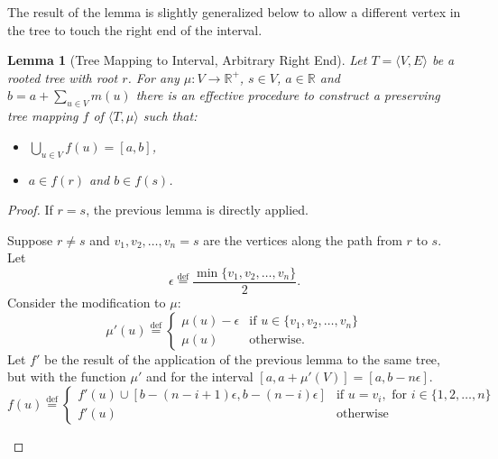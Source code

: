 \documentclass{article}
\newtheorem*{lemma}{Lemma}
\newcommand{\R}{\mathbb{R}}
\newcommand{\eqdef}{\stackrel{\text{def}}{=}}
\begin{document}
The result of the lemma is slightly generalized below to allow a different vertex in the tree to touch the right end of the interval.
\begin{lemma}[Tree Mapping to Interval, Arbitrary Right End]
    Let $T = \langle V, E \rangle$ be a rooted tree with root $r$. For any $\mu : V \rightarrow \R^+$, $s \in V$, $a \in \R$ and $b = a + \sum_{u \in V}m(u)$ there is an effective procedure to construct a preserving tree mapping $f$ of $\langle T, \mu \rangle$ such that:
  \begin{itemize}
  \item $\bigcup_{u \in V}f(u) = [a, b]$,
  \item $a \in f(r)$ and $b \in f(s)$.
  \end{itemize}
\end{lemma}
\begin{proof}
  If $r = s$, the previous lemma is directly applied.

  Suppose $r \neq s$ and $v_1, v_2, \dots, v_n = s$ are the vertices along the path from $r$ to $s$. Let
  \begin{equation*}
    \epsilon \eqdef \frac{\min\{v_1, v_2, \dots, v_n\}}{2}.
  \end{equation*}
  Consider the modification to $\mu$:
  \begin{equation*}
    \mu'(u) \eqdef
    \begin{cases}
      \mu(u) - \epsilon & \text{if } u \in \{v_1, v_2, \dots, v_n\} \\
      \mu(u) & \text{otherwise.}
    \end{cases}
  \end{equation*}
  Let $f'$ be the result of the application of the previous lemma to the same tree, but with the function $\mu'$ and for the interval $[a, a + \mu'(V)] = [a, b - n\epsilon]$.
  \begin{equation*}
    f(u) \eqdef
    \begin{cases}
      f'(u) \cup [b - (n - i + 1)\epsilon, b - (n - i)\epsilon] & \text{if } u = v_i, \text{ for } i \in \{1, 2, \dots, n\} \\
      f'(u) & \text{otherwise}
    \end{cases}
  \end{equation*}
  \begin{figure}[ht]
    \centering
\end{figure}
\end{proof}
\end{document}
